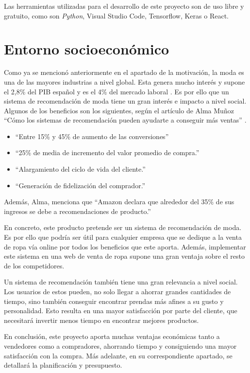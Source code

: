\documentclass[12pt]{report} %
\begin{document}
	Las herramientas utilizadas para el desarrollo de este proyecto son de uso libre y gratuito, como son \textit{Python},
	Visual Studio Code, Tensorflow, Keras o React.
	\section{Entorno socioeconómico}
	Como ya se mencionó anteriormente en el apartado de la motivación, la moda es una de las mayores industrias a nivel global.
	Esta genera mucho interés y supone el 2,8\% del PIB español y es el 4\% del mercado laboral \cite{estadisticas-moda}. Es por ello
	que un sistema de recomendación de moda tiene un gran interés e impacto a nivel social. Algunos de los beneficios son los siguientes,
	según el artículo de Alma Muñoz ``Cómo los sistemas de recomendación pueden ayudarte a conseguir más ventas'' \cite{alma}.
	\begin{itemize}
		\item ``Entre 15\% y 45\% de aumento de las conversiones''
		\item ``25\% de media de incremento del valor promedio de compra.''
		\item ``Alargamiento del ciclo de vida del cliente.''
		\item ``Generación de fidelización del comprador.''
	\end{itemize}


	Además, Alma, menciona que ``Amazon declara que alrededor del 35\% de sus ingresos se debe a recomendaciones de producto.''


	En concreto, este producto pretende ser un sistema de recomendación de moda. Es por ello que podría ser útil para cualquier empresa
	que se dedique a la venta de ropa vía online por todos los beneficios que este aporta.
	Además, implementar este sistema en una web de venta de ropa supone una gran ventaja sobre el resto de los competidores.
	
	Un sistema de recomendación también tiene una gran relevancia a nivel social. Los usuarios de estos pueden, no solo llegar
	a ahorrar grandes cantidades de tiempo, sino también conseguir encontrar prendas más afines a su gusto y personalidad. Esto
	resulta en una mayor satisfacción por parte del cliente, que necesitará invertir menos tiempo en encontrar mejores productos.


	En conclusión, este proyecto aporta muchas ventajas económicas tanto a vendedores como a compradores, ahorrando tiempo
	y consiguiendo una mayor satisfacción con la compra. Más adelante, en su correspondiente apartado, se detallará la planificación y presupuesto.
\end{document}
